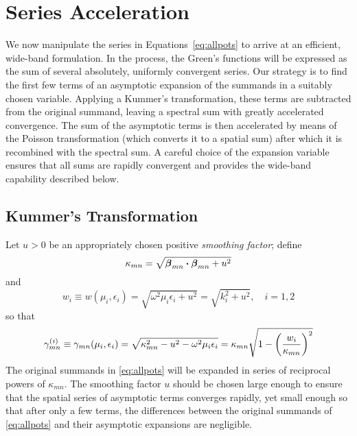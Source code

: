 \section{Series Acceleration}
  We now manipulate the series in Equations~\eqref{eq:allpots} to
  arrive at an efficient, 
wide-band formulation.  In the process, the Green's functions will be
expressed as the sum of several absolutely, uniformly convergent
series.  Our strategy is to find the first few terms of an asymptotic
expansion of the summands in a suitably chosen variable.  Applying a Kummer's
transformation, these terms are
subtracted from the original summand, leaving a spectral sum with greatly
accelerated convergence.  The sum of the asymptotic terms is then
accelerated by means of the Poisson transformation (which converts it to a
spatial sum) after which it is recombined
with the spectral sum.  A careful choice of the expansion variable ensures
that all sums are rapidly convergent and  provides
the wide-band capability described below.

\subsection{Kummer's Transformation}
Let $u>0$ 
be an appropriately chosen positive {\em smoothing factor}; define
\begin{equation}
  \kappa_{mn}  =  \sqrt{\boldsymbol{\beta}_{mn} \boldsymbol{\cdot} \boldsymbol{\beta}_{mn} +u^2}
         \label{eq:kappa}
\end{equation}
and
\begin{equation}
  w_i  \equiv w(\mu_i,\epsilon_i) =  
  \sqrt{\omega^2\mu_i\epsilon_i + u^2} =
  \sqrt{k_i^2+u^2}, \quad i=1,2 \label{eq:w}
\end{equation}
so that 
\begin{equation}
  \gamma^{(i)}_{mn} 
  \equiv \gamma_{mn} (\mu_i,\epsilon_i)
  = \sqrt{\kappa_{mn}^2 - u^2 - \omega^2\mu_i\epsilon_i}
  = \kappa_{mn} \sqrt{1 - \left(\frac{w_i}{\kappa_{mn}}\right)^2}
\end{equation}
The original summands in \eqref{eq:allpots} will be expanded in series of reciprocal 
powers
of $\kappa_{mn}$.  The smoothing factor $u$ should be chosen large enough to ensure that the 
spatial series of asymptotic terms converges rapidly, yet small
enough so that after only a few terms, the differences between the original summands
of \eqref{eq:allpots} and their asymptotic expansions are negligible. 

